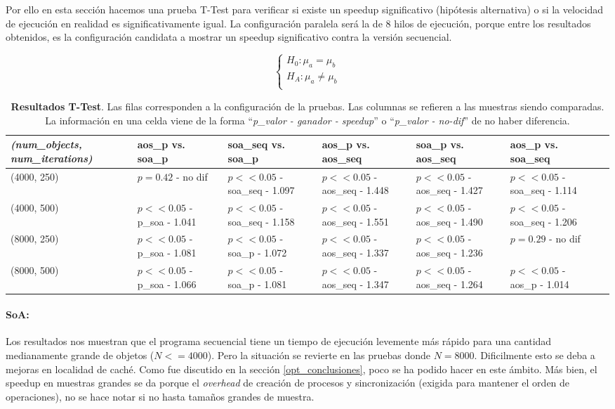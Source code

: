\documentclass{article}
\begin{document}
Por ello en esta sección hacemos una prueba T-Test para
verificar si existe un speedup significativo (hipótesis alternativa) o si la velocidad de ejecución en realidad
es significativamente igual. La configuración paralela será la de 8 hilos de ejecución, porque entre los resultados
obtenidos, es la configuración candidata a mostrar un speedup significativo contra la versión secuencial.

\begin{displaymath}
\begin{cases}
	{H_0}: \mu_a = \mu_b\\
	{H_A}: \mu_a \neq \mu_b\\
\end{cases}
\end{displaymath}

\begin{table}[htp]
\begin{tabular}{|p{3cm}|p{2cm}|p{2cm}|p{2cm}|p{2cm}|p{2cm}|p{2cm}|}
	\hline
	\textit{(num\_objects, num\_iterations)} & aos\_p vs. soa\_p & soa\_seq vs. soa\_p & aos\_p vs. aos\_seq & soa\_p vs. aos\_seq & aos\_p vs. soa\_seq \\
	\hline
	(4000, 250) & $p = 0.42$ - no dif & $p << 0.05$ - soa\_seq - 1.097 & $p << 0.05$ - aos\_seq - 1.448 & $p << 0.05$ - aos\_seq - 1.427 & $p << 0.05$ - soa\_seq - 1.114\\
	\hline
	(4000, 500) & $p << 0.05$ - p\_soa - 1.041 & $p << 0.05$ - soa\_seq - 1.158 & $p << 0.05$ - aos\_seq - 1.551 & $p << 0.05$ - aos\_seq - 1.490 & $p << 0.05$ - soa\_seq - 1.206\\
	\hline
	(8000, 250) & $p << 0.05$ - p\_soa - 1.081 & $p << 0.05$ - soa\_p - 1.072 & $p << 0.05$ - aos\_seq - 1.337 & $p << 0.05$ - aos\_seq - 1.236 & $p = 0.29$ - no dif\\
	\hline
	(8000, 500) & $p << 0.05$ - p\_soa - 1.066 & $p << 0.05$ - soa\_p - 1.081 & $p << 0.05$ - aos\_seq - 1.347 & $p << 0.05$ - aos\_seq - 1.264 & $p << 0.05$ - aos\_p - 1.014\\
	\hline
\end{tabular}
	\caption{\textbf{Resultados T-Test}. Las filas corresponden a la configuración de la pruebas. Las columnas se refieren a las muestras siendo comparadas.
	La información en una celda viene de la forma ``\textit{p\_valor - ganador - speedup}'' o ``\textit{p\_valor - no-dif}'' de no haber diferencia.}
\end{table}

\paragraph{SoA:}
Los resultados nos muestran que el programa secuencial tiene un tiempo de ejecución levemente más rápido
para una cantidad medianamente grande de objetos (${N} <= 4000$). Pero la situación se revierte
en las pruebas donde ${N} = 8000$. Dificilmente esto se deba a mejoras en localidad de caché.
Como fue discutido en la sección \ref{opt_conclusiones}, poco se ha podido hacer en este ámbito.
Más bien, el speedup en muestras grandes se da porque el \textit{overhead} de creación
de procesos y sincronización (exigida para mantener el orden de operaciones), no se hace notar
si no hasta tamaños grandes de muestra.
\end{document}
